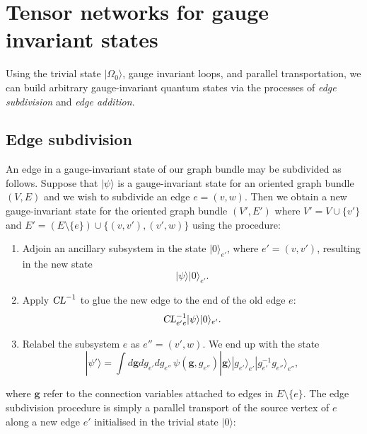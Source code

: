 \documentclass[12pt]{amsart}
\def\CL{\textsl{CL}}
\theoremstyle{definition}
\theoremstyle{remark}
\numberwithin{equation}{section}
\begin{document}
\section{Tensor networks for gauge invariant states}
Using the trivial state $|\Omega_0\rangle$, gauge invariant loops, and parallel transportation, we can build arbitrary gauge-invariant quantum states via the processes of \emph{edge subdivision} and \emph{edge addition}.

\subsection{Edge subdivision}
An edge in a gauge-invariant state of our graph bundle may be subdivided as follows. Suppose that $|\psi\rangle$ is a gauge-invariant state for an oriented graph bundle $(V,E)$ and we wish to subdivide an edge $e = (v,w)$. Then we obtain a new gauge-invariant state for the oriented graph bundle $(V',E')$ where $V' = V\cup \{v'\}$ and $E' = (E\setminus \{e\} )\cup\{ (v,v'), (v',w)\}$ using the procedure:
\begin{enumerate}
	\item Adjoin an ancillary subsystem in the state $|0\rangle_{e'}$, where $e' = (v,v')$, resulting in the new state
	\begin{equation}
		|\psi\rangle |0\rangle_{e'}.
	\end{equation} 
	\item Apply $\CL^{-1}$ to glue the new edge to the end of the old edge $e$:
	\begin{equation}
		\CL_{e' e}^{-1}|\psi\rangle |0\rangle_{e'}.
	\end{equation}
	\item Relabel the subsystem $e$ as $e'' = (v',w)$. We end up with the state
	\begin{equation}
		|\psi'\rangle = \int d\mathbf{g}dg_{e'}dg_{e''} \, \psi(\mathbf{g},g_{e''}) |\mathbf{g}\rangle |g_{e'}\rangle_{e'}  |g^{-1}_{e'}g_{e''}\rangle_{e''},
	\end{equation}
\end{enumerate}
where $\mathbf{g}$ refer to the connection variables attached to edges in $E\setminus \{e\}$.
The edge subdivision procedure is simply a parallel transport of the source vertex of $e$ along a new edge $e'$ initialised in the trivial state $|0\rangle$:
\end{document}
